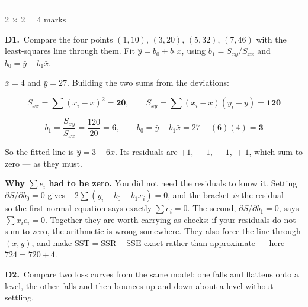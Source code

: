 \documentclass[10pt,a4paper]{article}
\newcommand{\parthead}[2]{\vspace{2pt}\noindent\rule{\linewidth}{0.4pt}\par\vspace{2pt}%
  \noindent{\bfseries Part #1}\hfill{\small #2}\par\vspace{1pt}}
\newcommand{\sol}[1]{\textbf{#1}}
\begin{document}
\parthead{D --- Short answer}{2 $\times$ 2 = 4 marks}

\textbf{D1.}\ Compare the four points $(1,10)$, $(3,20)$, $(5,32)$, $(7,46)$ with the least-squares line through them. Fit $\hat y = b_0 + b_1x$, using $b_1 = S_{xy}/S_{xx}$ and $b_0 = \bar y - b_1\bar x$.

\vspace{2pt}

$\bar x = 4$ and $\bar y = 27$. Building the two sums from the deviations:

\[ S_{xx} = \sum (x_i-\bar x)^2 = \sol{20}, \qquad S_{xy} = \sum (x_i-\bar x)(y_i-\bar y) = \sol{120} \]

\[ b_1 = \frac{S_{xy}}{S_{xx}} = \frac{120}{20} = \sol{6}, \qquad b_0 = \bar y - b_1\bar x = 27 - (6)(4) = \sol{3} \]

So the fitted line is $\hat y = 3 + 6 x$. Its residuals are $+1,\,-1,\,-1,\,+1$, which sum to zero --- as they must.

\vspace{2pt}

\textbf{Why $\sum e_i$ had to be zero.} You did not need the residuals to know it. Setting $\partial S/\partial b_0 = 0$ gives $-2\sum(y_i - b_0 - b_1x_i) = 0$, and the bracket \emph{is} the residual --- so the first normal equation says exactly $\sum e_i = 0$. The second, $\partial S/\partial b_1 = 0$, says $\sum x_ie_i = 0$. Together they are worth carrying as checks: if your residuals do not sum to zero, the arithmetic is wrong somewhere. They also force the line through $(\bar x, \bar y)$, and make $\mathrm{SST} = \mathrm{SSR} + \mathrm{SSE}$ exact rather than approximate --- here $724 = 720 + 4$.

\vspace{6pt}

\textbf{D2.}\ Compare two loss curves from the same model: one falls and flattens onto a level, the other falls and then bounces up and down about a level without settling.

\vspace{2pt}
\end{document}
